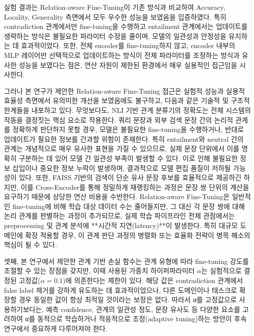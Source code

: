 \documentclass[a4paper,fleqn]{cas-sc}
\begin{document}
실험 결과는 Relation-aware Fine-Tuning이 기존 방식과 비교하여 Accuracy, Locality, Generality 측면에서 모두 우수한 성능을 보였음을 입증하였다. 특히 contradiction 관계에서만 fine-tuning을 수행하고 entailment 관계에서는 업데이트를 생략하는 방식은 불필요한 파라미터 수정을 줄이며, 모델의 일관성과 안정성을 유지하는 데 효과적이었다. 또한, 전체 encoder를 fine-tuning하지 않고, encoder 내부의 MLP 레이어만 선택적으로 업데이트하는 방식이 전체 파라미터를 조정하는 방식과 유사한 성능을 보였다는 점은, 연산 자원이 제한된 환경에서 매우 실용적인 접근임을 시사한다.

그러나 본 연구가 제안한 Relation-aware Fine-Tuning 접근은 실험적 성능과 실용적 효율성 측면에서 유의미한 개선을 보였음에도 불구하고, 다음과 같은 기술적 및 구조적 한계들을 내포하고 있다.
무엇보다도, NLI 기반 관계 분류기의 정확도는 전체 시스템의 작동을 결정짓는 핵심 요소로 작용한다. 쿼리 문장과 외부 검색 문장 간의 논리적 관계를 정확하게 판단하지 못할 경우, 모델은 불필요한 fine-tuning을 수행하거나, 반대로 업데이트가 필요한 정보를 간과할 위험이 존재한다. 특히 entailment와 neutral 간의 관계는 개념적으로 매우 유사한 표현을 가질 수 있으므로, 실제 문장 단위에서 이를 명확히 구분하는 데 있어 모델 간 일관성 부족이 발생할 수 있다. 이로 인해 불필요한 정보 삽입이나 중요한 정보 누락이 발생하며, 결과적으로 모델 편집 품질이 저하될 가능성이 있다.
또한, FAISS 기반의 검색이 단순 유사 문장 후보를 효율적으로 제공하긴 하지만, 이를 Cross-Encoder를 통해 정밀하게 재랭킹하는 과정은 문장 쌍 단위의 계산을 요구하기 때문에 상당한 연산 비용을 수반한다. Relation-aware Fine-Tuning은 일반적인 fine-tuning에 비해 학습 대상 데이터 수는 줄어들지만, 그 대신 각 문장 쌍에 대해 논리 관계를 판별하는 과정이 추가되므로, 실제 학습 파이프라인 전체 관점에서는 preprocessing 및 관계 분석에 **시간적 지연(latency)**이 발생한다. 특히 대규모 도메인에 확장 적용할 경우, 이 관계 판단 과정의 병렬화 또는 효율화 전략이 병목 해소의 핵심이 될 수 있다.

셋째, 본 연구에서 제안한 관계 기반 손실 함수는 관계 유형에 따라 fine-tuning 강도를 조절할 수 있는 장점을 갖지만, 이때 사용된 가중치 하이퍼파라미터 \(\alpha\)는 실험적으로 결정된 고정값(\(\alpha = 0.1\))에 의존한다는 제한이 있다. 해당 값은 contradiction 관계에서 false label 제거를 강하게 유도하는 데 효과적이었으나, 다른 도메인이나 태스크로 확장할 경우 동일한 값이 항상 최적일 것이라는 보장은 없다. 따라서 α를 고정값으로 사용하기보다는, 예측 confidence, 관계의 일관성 정도, 문장 유사도 등 다양한 요소를 고려하여 α를 동적으로 학습하거나 적응적으로 조정(adaptive tuning)하는 방안이 후속 연구에서 중요하게 다루어져야 한다.
\end{document}
